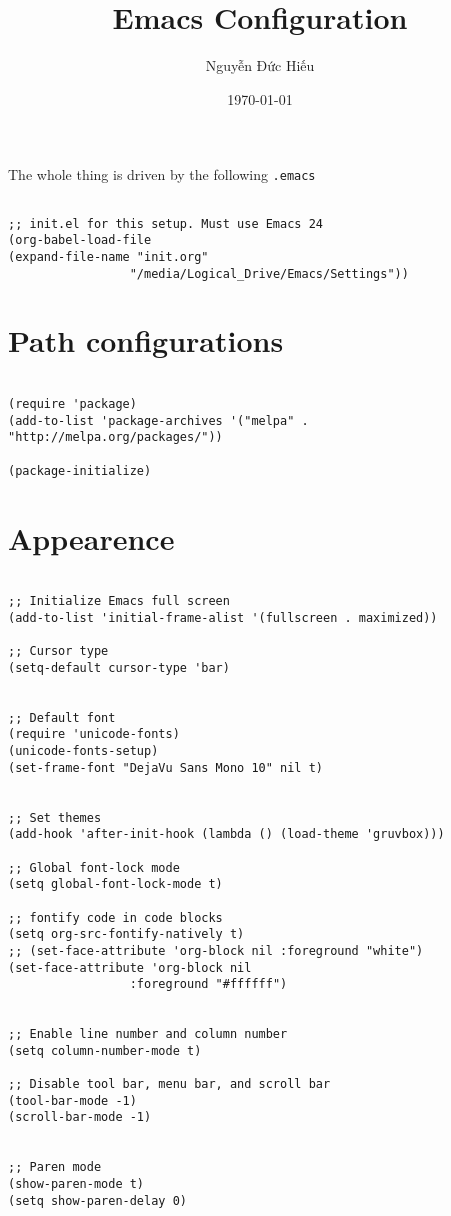 \documentclass[11pt]{article}
\author{Nguyễn Đức Hiếu}
\date{\today}
\title{Emacs Configuration}
\begin{document}
\maketitle
The whole thing is driven by the following \texttt{.emacs}

\begin{verbatim}

;; init.el for this setup. Must use Emacs 24
(org-babel-load-file
(expand-file-name "init.org"
                 "/media/Logical_Drive/Emacs/Settings"))
\end{verbatim}

\section*{Path configurations}
\label{sec:org7ed0e9f}

\begin{verbatim}

(require 'package)
(add-to-list 'package-archives '("melpa" . "http://melpa.org/packages/"))

(package-initialize)

\end{verbatim}

\section*{Appearence}
\label{sec:orgb390509}

\begin{verbatim}

;; Initialize Emacs full screen 
(add-to-list 'initial-frame-alist '(fullscreen . maximized))

;; Cursor type
(setq-default cursor-type 'bar)


;; Default font
(require 'unicode-fonts)
(unicode-fonts-setup)
(set-frame-font "DejaVu Sans Mono 10" nil t)


;; Set themes
(add-hook 'after-init-hook (lambda () (load-theme 'gruvbox)))

;; Global font-lock mode
(setq global-font-lock-mode t)

;; fontify code in code blocks
(setq org-src-fontify-natively t)
;; (set-face-attribute 'org-block nil :foreground "white")
(set-face-attribute 'org-block nil 
				 :foreground "#ffffff")


;; Enable line number and column number
(setq column-number-mode t)

;; Disable tool bar, menu bar, and scroll bar
(tool-bar-mode -1)
(scroll-bar-mode -1)


;; Paren mode
(show-paren-mode t)
(setq show-paren-delay 0)


\end{verbatim}
\end{document}
